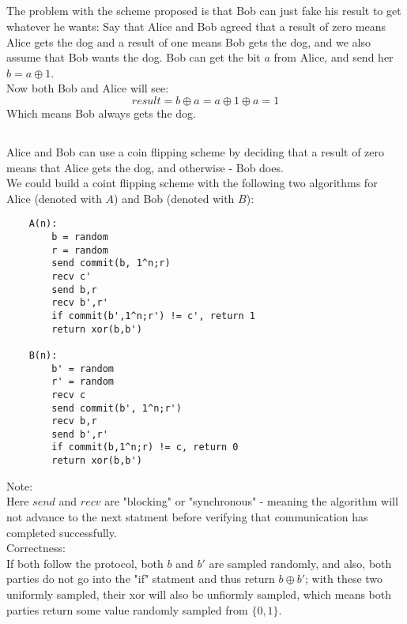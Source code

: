 \setcounter{section}{3}
\subsection{}
The problem with the scheme proposed is that Bob can just
fake his result to get whatever he wants: Say that Alice and Bob agreed
that a result of zero means Alice gets the dog and a result of one means
Bob gets the dog, and we also assume that Bob wants the dog.
Bob can get the bit $a$ from Alice, and send her $b=a\oplus 1$.\\
Now both Bob and Alice will see:
\[
	result=b\oplus a = a\oplus 1\oplus a = 1
\]
Which means Bob always gets the dog.

\subsection{}
Alice and Bob can use a coin flipping scheme by deciding that a result of
zero means that Alice gets the dog, and otherwise - Bob does.\\

We could build a coint flipping scheme with the following two algorithms
for Alice (denoted with $A$) and Bob (denoted with $B$):\\
\begin{verbatim}
	A(n):
		b = random
		r = random
		send commit(b, 1^n;r)
		recv c'
		send b,r
		recv b',r'
		if commit(b',1^n;r') != c', return 1
		return xor(b,b')

	B(n):
		b' = random
		r' = random
		recv c
		send commit(b', 1^n;r')
		recv b,r
		send b',r'
		if commit(b,1^n;r) != c, return 0
		return xor(b,b')
\end{verbatim}

Note:\\
Here $send$ and $recv$ are "blocking" or "synchronous" - meaning
the algorithm will not advance to the next statment before verifying
that communication has completed successfully.\\

Correctness:\\
If both follow the protocol, both $b$ and $b'$ are sampled
randomly, and also, both parties do not go into the "if" statment
and thus return $b\oplus b'$; with these two uniformly sampled, their
xor will also be unfiormly sampled, which means both parties return some
value randomly sampled from $\{0,1\}$.\\

